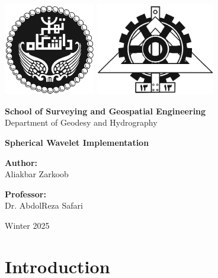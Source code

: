 \documentclass[12pt]{article}
\begin{document}
	
	\begin{titlepage}
		\begin{center}
			
			\includegraphics[height=4cm]{University_of_Tehran_Transparent_BW_logo.png} \hfill
			\includegraphics[height=4cm]{Fanni_Alt_BW_Logo.png}
			
			\vspace{1cm}
			
			\Large \textbf{School of Surveying and Geospatial Engineering}\\
			\large {Department of Geodesy and Hydrography}
			
			\vspace{3cm}
			
			\huge \textbf{Spherical Wavelet Implementation}\\
			\large \href{https://github.com/XIVAliakbarZarkoob/Spherical-Wavelets}{\faGithub}
			
			\vspace{3cm}
			
			\Large \textbf{Author:}\\
			\Large Aliakbar Zarkoob
			
			\vspace{2cm}
			
			\Large \textbf{Professor:}\\
			Dr. AbdolReza Safari
			
			\vfill
			
			\large {Winter 2025}
			
		\end{center}
	\end{titlepage}
	
	
	\section{Introduction}
	
\end{document}
